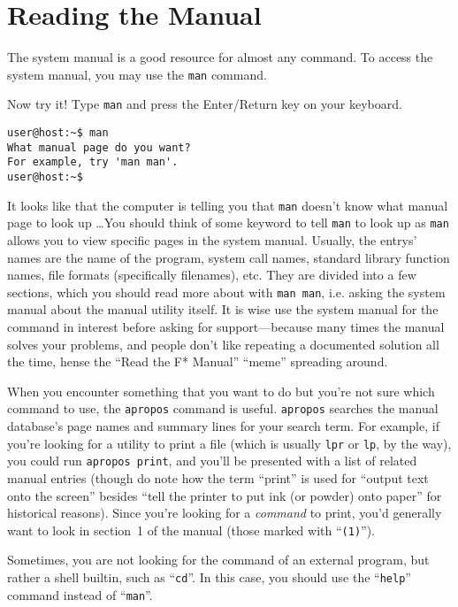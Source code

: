 \documentclass{extbook}
\begin{document}
\section{Reading the Manual}

The system manual is a good resource for almost any command.  To access the system manual, you may use the \verb|man| command.

Now try it!  Type \verb|man| and press the Enter/Return key on your keyboard.
\begin{verbatim}
user@host:~$ man
What manual page do you want?
For example, try 'man man'.
user@host:~$ 
\end{verbatim}

It looks like that the computer is telling you that \verb|man| doesn't know what manual page to look up \ldots You should think of some keyword to tell \verb|man| to look up as \verb|man| allows you to view specific pages in the system manual.  Usually, the entrys' names are the name of the program, system call names, standard library function names, file formats (specifically filenames), etc.  They are divided into a few sections, which you should read more about with \verb|man man|, i.e. asking the system manual about the manual utility itself.  It is wise use the system manual for the command in interest before asking for support---because many times the manual solves your problems, and people don't like repeating a documented solution all the time, hense the ``Read the F* Manual'' ``meme'' spreading around.

When you encounter something that you want to do but you're not sure which command to use, the \verb|apropos| command is useful.  \verb|apropos| searches the manual database's page names and summary lines for your search term.  For example, if you're looking for a utility to print a file (which is usually \verb|lpr| or \verb|lp|, by the way), you could run \verb|apropos print|, and you'll be presented with a list of related manual entries (though do note how the term ``print'' is used for ``output text onto the screen'' besides ``tell the printer to put ink (or powder) onto paper'' for historical reasons).  Since you're looking for a \emph{command} to print, you'd generally want to look in section~1 of the manual (those marked with ``\verb|(1)|'').

Sometimes, you are not looking for the command of an external program, but rather a shell builtin, such as ``\verb|cd|''.  In this case, you should use the ``\verb|help|'' command instead of ``\verb|man|''.
\end{document}
